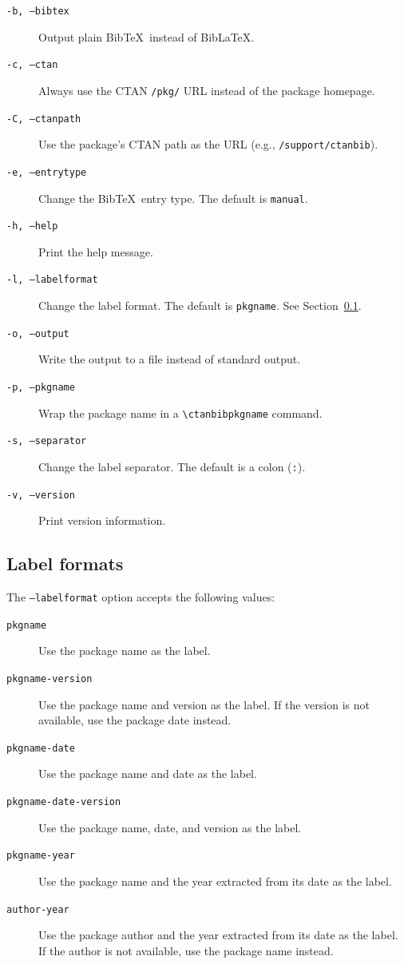 \documentclass[11pt]{ltxdoc}
\begin{document}
\begin{description}
  \item[\texttt{-b, --bibtex}] Output plain Bib\TeX\ instead of Bib\LaTeX.
  \item[\texttt{-c, --ctan}] Always use the CTAN \texttt{/pkg/} URL instead of the
    package homepage.
  \item[\texttt{-C, --ctanpath}] Use the package's CTAN path as the URL
    (e.g., \texttt{/support/ctanbib}).
  \item[\texttt{-e, --entrytype}] Change the Bib\TeX\ entry type. The default is
    \texttt{manual}.
  \item[\texttt{-h, --help}] Print the help message.
  \item[\texttt{-l, --labelformat}] Change the label format. The default is
    \texttt{pkgname}. See Section~\ref{sec:labelformats}.
  \item[\texttt{-o, --output}] Write the output to a file instead of standard output.
  \item[\texttt{-p, --pkgname}] Wrap the package name in a
    \verb|\ctanbibpkgname| command.
  \item[\texttt{-s, --separator}] Change the label separator. The default is a colon
    (\texttt{:}).
  \item[\texttt{-v, --version}] Print version information.
\end{description}

\subsection{Label formats}
\label{sec:labelformats}

The \texttt{--labelformat} option accepts the following values:

\begin{description}
  \item[\texttt{pkgname}] Use the package name as the label.
  \item[\texttt{pkgname-version}] Use the package name and version as the
    label. If the version is not available, use the package date instead.
  \item[\texttt{pkgname-date}] Use the package name and date as the label.
  \item[\texttt{pkgname-date-version}] Use the package name, date, and
    version as the label.
  \item[\texttt{pkgname-year}] Use the package name and the year extracted
    from its date as the label.
  \item[\texttt{author-year}] Use the package author and the year extracted
    from its date as the label. If the author is not available, use the
    package name instead.
\end{description}
\end{document}
